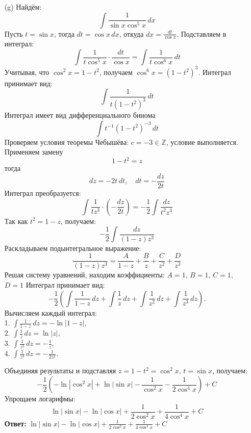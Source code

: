\documentclass[a4paper]{article}
\begin{document}
\begin{enumerate}
\begin{enumerate}
    \item[(g)]Найдём:
    $$\int \frac{1}{\sin x \cos^5 x} \, dx$$
    Пусть \( t = \sin x \), тогда \( dt = \cos x \, dx \), откуда \( dx = \frac{dt}{\cos x} \). Подставляем в интеграл:  
    \[
    \int \frac{1}{t \cos^5 x} \cdot \frac{dt}{\cos x} = \int \frac{1}{t \cos^6 x} \, dt
    \]  
    Учитывая, что \( \cos^2 x = 1 - t^2 \), получаем \( \cos^6 x = (1 - t^2)^3 \). Интеграл принимает вид:  
    \[
    \int \frac{1}{t (1 - t^2)^3} \, dt
    \]  
    Интеграл имеет вид дифференциального бинома 
    \[ \int t^{-1} (1 - t^2)^{-3} \, dt \] 
    Проверяем условия теоремы Чебышёва:  
    \( c = -3 \in \mathbb{Z} \), условие выполняется.  
    Применяем замену \[ 1 - t^2 = z \]
    тогда \[ dz = -2t \, dt,\quad  dt = -\frac{dz}{2t} \]
    Интеграл преобразуется:  
    \[
    \int \frac{1}{t z^3} \cdot \left(-\frac{dz}{2t}\right) = -\frac{1}{2} \int \frac{dz}{t^2 z^3}
    \]  
    Так как \( t^2 = 1 - z \), получаем:  
    \[
    -\frac{1}{2} \int \frac{dz}{(1 - z) z^3}
    \]  
    Раскладываем подынтегральное выражение:  
    \[
    \frac{1}{(1 - z) z^3} = \frac{A}{1 - z} + \frac{B}{z} + \frac{C}{z^2} + \frac{D}{z^3}
    \]  
    Решая систему уравнений, находим коэффициенты:  
    \( A = 1 \), \( B = 1 \), \( C = 1 \), \( D = 1 \)
    Интеграл принимает вид:  
    \[
    -\frac{1}{2} \left( \int \frac{1}{1 - z} \, dz + \int \frac{1}{z} \, dz + \int \frac{1}{z^2} \, dz + \int \frac{1}{z^3} \, dz \right).
    \]  
    Вычисляем каждый интеграл:  \\
    1. \(\int \frac{1}{1 - z} \, dz = -\ln|1 - z|\),  \\
    2. \(\int \frac{1}{z} \, dz = \ln|z|\),  \\
    3. \(\int \frac{1}{z^2} \, dz = -\frac{1}{z}\),  \\
    4. \(\int \frac{1}{z^3} \, dz = -\frac{1}{2z^2}\).  

    Объединяя результаты и подставляя \( z = 1 - t^2 = \cos^2 x \), \( t = \sin x \), получаем:  
    \[
    -\frac{1}{2} \left( -\ln|\cos^2 x| + \ln|\sin x| - \frac{1}{\cos^2 x} - \frac{1}{2 \cos^4 x} \right) + C
    \]  
    Упрощаем логарифмы:  
    \[
    \ln|\sin x| - \ln|\cos x| + \frac{1}{2 \cos^2 x} + \frac{1}{4 \cos^4 x} + C
    \]  
    \textbf{Ответ: } $\ln|\sin x| - \ln|\cos x| + \frac{1}{2 \cos^2 x} + \frac{1}{4 \cos^4 x} + C$\\

\end{enumerate}


\end{enumerate}
\end{document}
